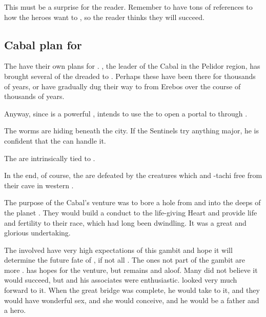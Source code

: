 This must be a surprise for the reader. 
Remember to have tons of references to how the heroes want to , so the reader thinks they will succeed. 










\subsection{Cabal plan for \Malcur}
The  have their own plans for \Malcur. 
, the leader of the Cabal in the Pelidor region, has brought several of the dreaded  to \Malcur. Perhaps these \noggyaleth{} have been there for thousands of years, or have gradually dug their way to \Malcur from Erebos over the course of thousands of years. 

Anyway, since \Malcur is a powerful \nexus, \Teshrial{} intends to use the \noggyaleth{} to open a portal to  through \Malcur. 

The worms are hiding beneath the city. 
If the Sentinels try anything major, he is confident that the \noggyaleth{} can handle it. 

The \noggyaleth{} are intrinsically tied to .

In the end, of course, the \noggyaleth{} are defeated by the creatures which \Ishnaruchaefir{} and \Shilred-tachi free from their cave in western \PelidorContinent. 

The purpose of the Cabal's \Malcur venture was to bore a hole from \Nyx and into the deeps of the planet \Miith.
They would build a conduct to the life-giving Heart and provide life and fertility to their race, which had long been dwindling.
It was a great and glorious undertaking.

The \resphain involved have very high expectations of this gambit and hope it will determine the future fate of \CiriathSepher, if not all \resphain. 
The ones not part of the gambit are more \skeptical. 
\Azraid has hopes for the venture, but remains \skeptical and aloof.
Many did not believe it would succeed, but \Teshrial and his associates were enthusiastic.
\Teshrial looked very much forward to it.
When the great bridge was complete, he would take \Firaxel to it, and they would have wonderful sex, and she would conceive, and he would be a father and a hero.

